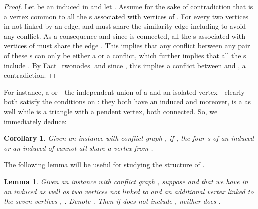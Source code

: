 \documentclass[final]{dmtcs-episciences}
\newtheorem{lemma}[theorem]{Lemma}
\newtheorem{corollary}[theorem]{Corollary}
\newcommand\mar[1]{\textcolor{black}{#1}}
\begin{document}
\begin{proof}
Let \mar{} be an induced  in   and let . 
Assume for the sake of contradiction that  is a vertex common to all the s \mar{associated with vertices of} . For every two vertices  in  not linked by an edge,  and  must share the similarity edge including  to avoid any conflict. As a consequence and since   is connected, all 
the s \mar{associated with vertices of}  must share the edge . 
This implies that  any conflict between any pair of these s can only be either a
 or a  conflict, which further implies that all the s  include  .
By Fact~\ref{twonodes} and since , this implies a conflict between  and , a contradiction.\end{proof}

For instance, a  or  \-- the independent union of a  and an isolated vertex \-- clearly both satisfy the conditions on : they both have an induced  and moreover,  is a  as well while  is a triangle with a pendent vertex, both connected. So, we immediately deduce:

\begin{corollary}
\label{lem_P4}
Given an instance  with conflict graph , if , the four s of an induced  or an induced  of  
cannot all share a vertex from .
\end{corollary}


The following lemma will be useful for studying the structure of .

\begin{lemma}\label{lem:5nodes}
Given an instance  with conflict graph , suppose  and that  we have in  an induced   as well as two vertices  not linked to  and an additional vertex   linked to the seven vertices , . Denote .
Then if  does not include , neither does . 
\end{lemma}
\end{document}
